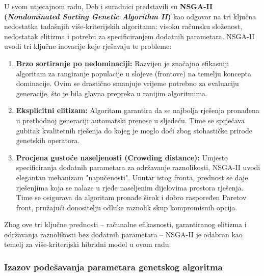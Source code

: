 U svom utjecajnom radu, Deb i suradnici \cite{Deb2002} predstavili su \textbf{NSGA-II (\textit{Nondominated Sorting Genetic Algorithm II})} kao odgovor na tri ključna nedostatka tadašnjih više-kriterijskih algoritama: visoku računsku složenost, nedostatak elitizma i potrebu za specificiranjem dodatnih parametara. NSGA-II uvodi tri ključne inovacije koje rješavaju te probleme:

\begin{enumerate}
\item \textbf{Brzo sortiranje po nedominaciji:} Razvijen je značajno efikasniji algoritam za rangiranje populacije u slojeve (frontove) na temelju koncepta dominacije. Ovim se drastično smanjuje vrijeme potrebno za evaluaciju generacije, što je bila glavna prepreka u ranijim algoritmima.

\item \textbf{Eksplicitni elitizam:} Algoritam garantira da se najbolja rješenja pronađena u prethodnoj generaciji automatski prenose u sljedeću. Time se sprječava gubitak kvalitetnih rješenja do kojeg je moglo doći zbog stohastičke prirode genetskih operatora.

\item \textbf{Procjena gustoće naseljenosti (Crowding distance):} Umjesto specificiranja dodatnih parametara za održavanje raznolikosti, NSGA-II uvodi elegantan mehanizam "napučenosti". Unutar istog fronta, prednost se daje rješenjima koja se nalaze u rjeđe naseljenim dijelovima prostora rješenja. Time se osigurava da algoritam pronađe širok i dobro raspoređen Paretov front, pružajući donositelju odluke raznolik skup kompromisnih opcija.
\end{enumerate}

Zbog ove tri ključne prednosti – računalne efikasnosti, garantiranog elitizma i održavanja raznolikosti bez dodatnih parametara – NSGA-II je odabran kao temelj za više-kriterijski hibridni model u ovom radu.
\subsubsection{Izazov podešavanja parametara genetskog algoritma}

